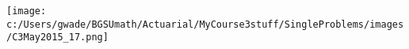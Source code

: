 
\texttt{[image: c:/Users/gwade/BGSUmath/Actuarial/MyCourse3stuff/SingleProblems/images/C3May2015\_17.png]}

\showsol{\bsoln

\esoln}
